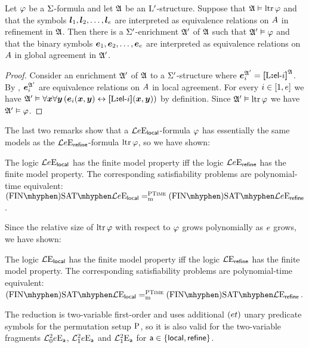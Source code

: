 \begin{remark}
Let $\varphi$ be a $\mathrm{\Sigma}$-formula and let $\mathfrak{A}$ be an ${{\mathrm{L}}'}$-structure.
Suppose that $\mathfrak{A} \vDash \operatorname{ltr}\varphi$ and that the symbols
$\bm{l}_{1}, \bm{l}_{2}, \dots, \bm{l}_{e}$ are interpreted as equivalence relations on
$A$ in refinement in $\mathfrak{A}$.
Then there is a $\mathrm{\Sigma'}$-enrichment $\mathfrak{A'}$ of $\mathfrak{A}$ such that
$\mathfrak{A'} \vDash \varphi$ and that the binary symbols
$\bm{e}_{1}, \bm{e}_{2}, \dots, \bm{e}_{e}$
are interpreted as equivalence relations on $A$ in global agreement in
$\mathfrak{A'}$.
\end{remark}
\begin{proof}
Consider an enrichment $\mathfrak{A'}$ of $\mathfrak{A}$ to a $\mathrm{\Sigma'}$-structure where
$\bm{e}_{i}^{\mathfrak{A'}} = {\bm{[}{\mathrm{L}}\mathord{\bm{:}}\mathsf{el}{\hbox{-}}i\bm{]}}^{\mathfrak{A}}$.
By , $\bm{e}_{i}^{\mathfrak{A'}}$ are equivalence
relations on $A$ in local agreement. 
For every $i \in [1,e]$ we have
$\mathfrak{A'} \vDash \forall\bm{x}\forall\bm{y} \left(\bm{e}_{i}(\bm{x},\bm{y}) \leftrightarrow
{\bm{[}{\mathrm{L}}\mathord{\bm{:}}\mathsf{el}{\hbox{-}}i\bm{]}}(\bm{x},\bm{y})\right)$ by definition.
Since $\mathfrak{A'} \vDash \operatorname{ltr}\varphi$ we have $\mathfrak{A'} \vDash \varphi$.
\end{proof}

The last two remarks show that a $\mathcal{L}{e}\mathrm{E}_{\mathsf{local}}$-formula $\varphi$
has essentially the same models as the $\mathcal{L}{e}\mathrm{E}_{\mathsf{refine}}$-formula
$\operatorname{ltr}\varphi$, so we have shown:

\begin{proposition}\label{prop:local-to-refine-n}
The logic $\mathcal{L}{e}\mathrm{E}_{\mathsf{local}}$ has the finite model property iff
the logic $\mathcal{L}{e}\mathrm{E}_{\mathsf{refine}}$ has the finite model property.
The corresponding satisfiability problems are polynomial-time equivalent:
$\FinASat{\Fo\Eea\sze\aglocal} \redeq\cP \FinASat{\Fo\Eea\sze\agrefine}$.
\end{proposition}

Since the relative size of $\operatorname{ltr}\varphi$ with respect to $\varphi$ grows
polynomially as $e$ grows, we have shown:
\begin{proposition}\label{prop:local-to-refine}
The logic $\mathcal{L}{{}}\mathrm{E}_{\mathsf{local}}$ has the finite model property iff
the logic $\mathcal{L}{{}}\mathrm{E}_{\mathsf{refine}}$ has the finite model property.
The corresponding satisfiability problems are polynomial-time equivalent:
$\FinASat{\Fo\Eea\nosze\aglocal} \redeq\cP \FinASat{\Fo\Eea\nosze\agrefine}$.
\end{proposition}

The reduction is two-variable first-order and uses additional $(et)$
unary predicate symbols for the permutation setup ${\mathrm{P}}$, so it is also valid
for the two-variable fragments $\mathcal{L}^{2}_{0}{e}\mathrm{E}_{\mathsf{a}}$, $\mathcal{L}^{2}_{1}{e}\mathrm{E}_{\mathsf{a}}$
and $\mathcal{L}^{2}_{1}{{}}\mathrm{E}_{\mathsf{a}}$ for $\mathsf{a} \in \left\{\mathsf{local}, \mathsf{refine}\right\}$.